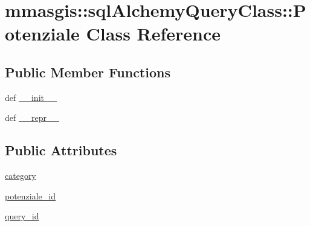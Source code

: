 \hypertarget{classmmasgis_1_1sqlAlchemyQueryClass_1_1Potenziale}{
\section{mmasgis::sqlAlchemyQueryClass::Potenziale Class Reference}
\label{classmmasgis_1_1sqlAlchemyQueryClass_1_1Potenziale}
}
\subsection*{Public Member Functions}
\begin{DoxyCompactItemize}
\item 
def \hyperlink{classmmasgis_1_1sqlAlchemyQueryClass_1_1Potenziale_a73176c834f5132e2a35531bafde39ea8}{\_\-\_\-init\_\-\_\-}
\item 
def \hyperlink{classmmasgis_1_1sqlAlchemyQueryClass_1_1Potenziale_acf1d488f40e113842bebf2f63cc8573d}{\_\-\_\-repr\_\-\_\-}
\end{DoxyCompactItemize}
\subsection*{Public Attributes}
\begin{DoxyCompactItemize}
\item 
\hyperlink{classmmasgis_1_1sqlAlchemyQueryClass_1_1Potenziale_a6c32f0eb1a8fb86dae28f94c04ad8856}{category}
\item 
\hyperlink{classmmasgis_1_1sqlAlchemyQueryClass_1_1Potenziale_ab7385f41e6c5dd3615da1dd3a8c1661e}{potenziale\_\-id}
\item 
\hyperlink{classmmasgis_1_1sqlAlchemyQueryClass_1_1Potenziale_a72a6af708fc6051c09dddea0904d99d4}{query\_\-id}
\end{DoxyCompactItemize}
